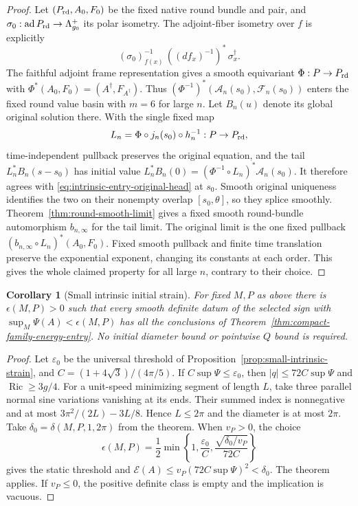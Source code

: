 \documentclass[11pt]{article}
\numberwithin{equation}{section}
\newtheorem{corollary}[theorem]{Corollary}
\theoremstyle{definition}
\theoremstyle{remark}
\DeclareMathOperator{\Ric}{Ric}
\begin{document}
\begin{proof}
Let $(P_{\rm rd},A_0,F_0)$ be the fixed native round bundle
and pair, and $\sigma_0:\operatorname{ad}P_{\rm rd}
\to\Lambda^+_{g_0}$ its polar isometry.
The adjoint-fiber isometry over $f$ is explicitly
\[
 (\sigma_0)_{f(x)}^{-1}\,((df_x)^{-1})^*\,\sigma^\dagger_x.
\]
The faithful adjoint frame representation gives a smooth
equivariant $\Phi:P\to P_{\rm rd}$ with
$\Phi^*(A_0,F_0)=(A^\dagger,F_{A^\dagger})$.
Thus $(\Phi^{-1})^*(\mathcal A_n(s_0),\mathcal F_n(s_0))$
enters the fixed round value basin with $m=6$ for large $n$.
Let $B_n(u)$ denote its global original solution there.
With the single fixed map
\begin{equation}\label{eq:intrinsic-entry-tail-map}
 L_n=\Phi\circ j_n(s_0)\circ h_n^{-1}:P\to P_{\rm rd},
\end{equation}
time-independent pullback preserves the original equation,
and the tail $L_n^*B_n(s-s_0)$ has initial value
$L_n^*B_n(0)=(\Phi^{-1}\circ L_n)^*\mathcal A_n(s_0)$.
It therefore agrees with
\eqref{eq:intrinsic-entry-original-head} at $s_0$.
Smooth original uniqueness identifies the two on their
nonempty overlap $[s_0,\theta]$, so they splice smoothly.
Theorem~\ref{thm:round-smooth-limit} gives a fixed smooth
round-bundle automorphism $b_{n,\infty}$ for the tail limit.
The original limit is the one fixed pullback
$(b_{n,\infty}\circ L_n)^*(A_0,F_0)$.
Fixed smooth pullback and finite time translation preserve
the exponential exponent, changing its constants at each
order. This gives the whole claimed property for all large
$n$, contrary to their choice.
\end{proof}

\begin{corollary}[Small intrinsic initial strain]
\label{cor:intrinsic-small-strain-entry}
For fixed $M,P$ as above there is $\epsilon(M,P)>0$ such
that every smooth definite datum of the selected sign with
$\sup_M\Psi(A)<\epsilon(M,P)$ has all the conclusions of
Theorem~\ref{thm:compact-family-energy-entry}.
No initial diameter bound or pointwise $Q$ bound is required.
\end{corollary}
\begin{proof}
Let $\varepsilon_0$ be the universal threshold of
Proposition~\ref{prop:small-intrinsic-strain}, and
$C=(1+4\sqrt3)/(4\pi/5)$. If
$C\sup\Psi\le\varepsilon_0$, then
$|q|\le72C\sup\Psi$ and $\Ric\ge3g/4$.
For a unit-speed minimizing segment of length $L$, take
three parallel normal sine variations vanishing at its
ends. Their summed index is nonnegative and at most
$3\pi^2/(2L)-3L/8$. Hence $L\le2\pi$ and the diameter
is at most $2\pi$.
Take $\delta_0=\delta(M,P,1,2\pi)$ from the theorem.
When $v_P>0$, the choice
\[
 \epsilon(M,P)=\frac12\min\left\{
  1,\frac{\varepsilon_0}{C},
       \frac{\sqrt{\delta_0/v_P}}{72C}\right\}
\]
gives the static threshold and
$\mathscr E(A)\le v_P(72C\sup\Psi)^2<\delta_0$.
The theorem applies. If $v_P\le0$, the positive definite
class is empty and the implication is vacuous.
\end{proof}
\end{document}
